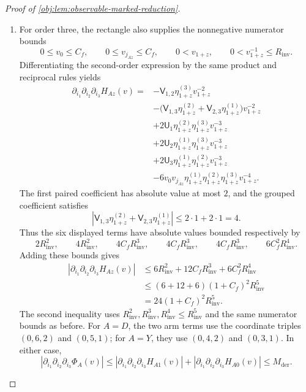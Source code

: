 \begin{proof}[Proof of \cref{obj:lem:observable-marked-reduction}]
\begin{enumerate}
\item For order three, the rectangle also supplies the nonnegative numerator bounds
\[
0\le v_0\le C_f,\qquad
0\le v_{j_{Az}}\le C_f,
\qquad
0<v_{1+z},\qquad
0<v_{1+z}^{-1}\le R_{\mathrm{inv}}.
\]
Differentiating the second-order expression by the same product and reciprocal rules yields
\[
\begin{aligned}
\partial_{i_1}\partial_{i_2}\partial_{i_3}H_{Az}(v)
={}&-\mathsf V_{1,2}\eta^{(3)}_{1+z}v_{1+z}^{-2}\\
&-\bigl(\mathsf V_{1,3}\eta^{(2)}_{1+z}
       +\mathsf V_{2,3}\eta^{(1)}_{1+z}\bigr)v_{1+z}^{-2}\\
&+2\mathsf U_1\eta^{(2)}_{1+z}\eta^{(3)}_{1+z}v_{1+z}^{-3}\\
&+2\mathsf U_2\eta^{(1)}_{1+z}\eta^{(3)}_{1+z}v_{1+z}^{-3}\\
&+2\mathsf U_3\eta^{(1)}_{1+z}\eta^{(2)}_{1+z}v_{1+z}^{-3}\\
&-6v_0v_{j_{Az}}\eta^{(1)}_{1+z}
                    \eta^{(2)}_{1+z}\eta^{(3)}_{1+z}v_{1+z}^{-4}.
\end{aligned}
\]
The first paired coefficient has absolute value at most \(2\), and the grouped coefficient satisfies
\[
\left|\mathsf V_{1,3}\eta^{(2)}_{1+z}
       +\mathsf V_{2,3}\eta^{(1)}_{1+z}\right|
\le2\cdot1+2\cdot1=4.
\]
Thus the six displayed terms have absolute values bounded respectively by
\[
2R_{\mathrm{inv}}^2,\qquad
4R_{\mathrm{inv}}^2,\qquad
4C_fR_{\mathrm{inv}}^3,\qquad
4C_fR_{\mathrm{inv}}^3,\qquad
4C_fR_{\mathrm{inv}}^3,\qquad
6C_f^2R_{\mathrm{inv}}^4.
\]
Adding these bounds gives
\[
\begin{aligned}
|\partial_{i_1}\partial_{i_2}\partial_{i_3}H_{Az}(v)|
&\le6R_{\mathrm{inv}}^2
    +12C_fR_{\mathrm{inv}}^3
    +6C_f^2R_{\mathrm{inv}}^4\\
&\le(6+12+6)(1+C_f)^2R_{\mathrm{inv}}^5\\
&=24(1+C_f)^2R_{\mathrm{inv}}^5.
\end{aligned}
\]
The second inequality uses \(R_{\mathrm{inv}}^2,R_{\mathrm{inv}}^3,
R_{\mathrm{inv}}^4\le R_{\mathrm{inv}}^5\) and the same numerator bounds as before. For \(A=D\), the two arm terms use the coordinate triples \((0,6,2)\) and \((0,5,1)\); for \(A=Y\), they use \((0,4,2)\) and \((0,3,1)\). In either case,
\[
|\partial_{i_1}\partial_{i_2}\partial_{i_3}\Phi_A(v)|
\le|\partial_{i_1}\partial_{i_2}\partial_{i_3}H_{A1}(v)|
  +|\partial_{i_1}\partial_{i_2}\partial_{i_3}H_{A0}(v)|
\le M_{\mathrm{der}}.
\]


\end{enumerate}
\end{proof}
